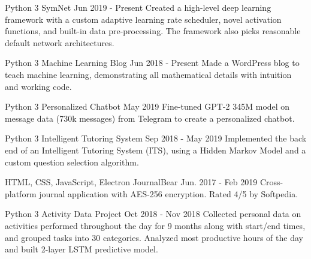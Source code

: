 

\begin{cventries}

  \cventry
    {Python 3} %
    {SymNet} %
    {} %
    {Jun 2019 - Present} %
    {
      Created a high-level deep learning framework with a custom adaptive learning rate scheduler, novel activation functions, and built-in data pre-processing. The framework also picks reasonable default network architectures.
    }

  \cventry
    {Python 3} %
    {Machine Learning Blog} %
    {} %
    {Jun 2018 - Present} %
    {
      Made a WordPress blog to teach machine learning, demonstrating all mathematical details with intuition and working code.
    }
    
  \cventry
    {Python 3} %
    {Personalized Chatbot} %
    {} %
    {May 2019} %
    {
      Fine-tuned GPT-2 345M model on message data (730k messages) from Telegram to create a personalized chatbot.
    }

  \cventry
    {Python 3} %
    {Intelligent Tutoring System} %
    {} %
    {Sep 2018 - May 2019} %
    {
      Implemented the back end of an Intelligent Tutoring System (ITS), using a Hidden Markov Model and a custom question selection algorithm.
    }

  \cventry
    {HTML, CSS, JavaScript, Electron} %
    {JournalBear} %
    {} %
    {Jun. 2017 - Feb 2019} %
    {
      Cross-platform journal application with AES-256 encryption. Rated 4/5 by Softpedia.
    }

  \cventry
    {Python 3} %
    {Activity Data Project} %
    {} %
    {Oct 2018 - Nov 2018} %
    {
      Collected personal data on activities performed throughout the day for 9 months along with start/end times, and grouped tasks into 30 categories. Analyzed most productive hours of the day and built 2-layer LSTM predictive model.
    }


\end{cventries}

